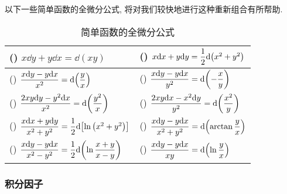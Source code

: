 
以下一些简单函数的全微分公式, 将对我们较快地进行这种重新组合有所帮助.
\setcounter{magicrownumbers}{0}
\begin{table}[H]
    \centering
    \caption{简单函数的全微分公式}
    \begin{tabular}{l l}
        (\rownumber{}) $x\dd y+y\dd x=\dd (xy)$                                                   & (\rownumber{}) $x\dd x+y\dd y=\dfrac{1}{2}\dd \qty(x^2+y^2)$                 \\
        \midrule
        (\rownumber{}) $\dfrac{x\dd y-y\dd x}{x^2}=\dd \qty(\dfrac{y}{x})$                        & (\rownumber{}) $\dfrac{x\dd y-y\dd x}{y^2}=\dd \qty(-\dfrac{x}{y})$          \\
        (\rownumber{}) $\dfrac{2xy\dd y-y^2\dd x}{x^2}=\dd\qty(\dfrac{y^2}{x})$                   & (\rownumber{}) $\dfrac{2xy\dd x-x^2\dd y}{y^2}=\dd \qty(\dfrac{x^2}{y})$     \\
        \midrule
        (\rownumber{}) $\dfrac{x\dd x+y\dd y}{x^2+y^2}=\dfrac{1}{2}\dd \qty[\ln\qty(x^2+y^2)]$    & (\rownumber{}) $\dfrac{x\dd y-y\dd x}{x^2+y^2}=\dd\qty(\arctan\dfrac{y}{x})$ \\
        (\rownumber{}) $\dfrac{x\dd y-y\dd x}{x^2-y^2}=\dfrac{1}{2}\dd \qty(\ln\dfrac{x+y}{x-y})$ & (\rownumber{}) $\dfrac{x\dd y-y\dd x}{xy}=\dd \qty(\ln\dfrac{y}{x})$         \\
    \end{tabular}
\end{table}

\subsubsection{积分因子}

